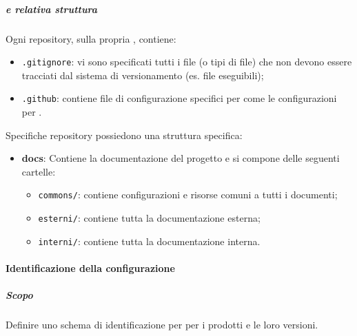             \subparagraph{ e relativa struttura}
            Ogni repository, sulla propria , contiene:
            \begin{itemize}
                \item \verb!.gitignore!: vi sono specificati tutti i file (o tipi di file) che non devono essere tracciati dal sistema di versionamento (es. file eseguibili);
                \item \verb!.github!: contiene file di configurazione specifici per  come le configurazioni per .
            \end{itemize}
            Specifiche repository possiedono una struttura specifica:
            \begin{itemize}
                \item \textbf{docs}: Contiene la documentazione del progetto e si compone delle seguenti cartelle:
                \begin{itemize}
                    \item \verb!commons/!: contiene configurazioni e risorse comuni a tutti i documenti;
                    \item \verb!esterni/!: contiene tutta la documentazione esterna;
                    \item \verb!interni/!: contiene tutta la documentazione interna.
                \end{itemize}
            \end{itemize}

        \paragraph{Identificazione della configurazione}
            \subparagraph{Scopo}
            Definire uno schema di identificazione per per i prodotti e le loro versioni.

